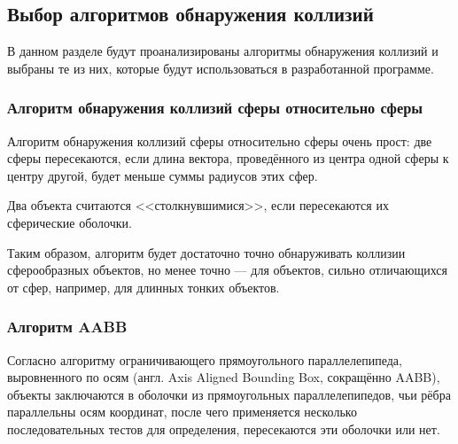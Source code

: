 



\subsection{Выбор алгоритмов обнаружения коллизий}

В данном разделе будут проанализированы алгоритмы обнаружения коллизий и выбраны те из них, которые будут использоваться в разработанной программе.

\subsubsection{Алгоритм обнаружения коллизий сферы относительно сферы}

Алгоритм обнаружения коллизий сферы относительно сферы очень прост: две сферы пересекаются, если длина вектора, проведённого из центра одной сферы к центру другой, будет меньше суммы радиусов этих сфер. %

Два объекта считаются <<столкнувшимися>>, если пересекаются их сферические оболочки.

Таким образом, алгоритм будет достаточно точно обнаруживать коллизии сферообразных объектов, но менее точно --- для объектов, сильно отличающихся от сфер, например, для длинных тонких объектов.

\subsubsection{Алгоритм AABB}

Согласно алгоритму ограничивающего прямоугольного параллелепипеда, выровненного по осям (англ. Axis Aligned Bounding Box, сокращённо AABB), объекты заключаются в оболочки из прямоугольных параллелепипедов, чьи рёбра параллельны осям координат, после чего применяется несколько последовательных тестов для определения, пересекаются эти оболочки или нет. %

